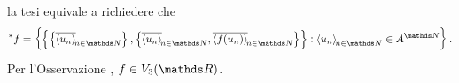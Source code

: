 {\begin{enumerate}
        la tesi equivale a richiedere che \begin{equation*}
            \nonstandard{f} = \set{
                \set{\set{\filtersequence{u_{n}}}, \set{\filtersequence{u_{n}}, \filtersequence{f(u_{n} ) }}}: \sequence{u_{n} } \in A^{\N}
            }.
        \end{equation*}Per l'Osservazione , $ f \in V_3(\R) $. 
        

\end{enumerate}}
